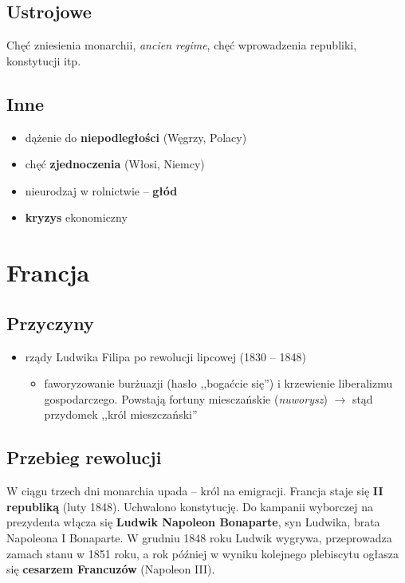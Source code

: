 \documentclass [a4paper, 11pt, oneside]{book}
\begin{document}
        \subsection{Ustrojowe} %
        \label{sub:ustrojowe}
            Chęć zniesienia monarchii, \emph{ancien regime}, chęć wprowadzenia republiki, konstytucji itp.
        \subsection{Inne} %
        \label{sub:inne}
            \begin{itemize}
                \item dążenie do \textbf{niepodległości} (Węgrzy, Polacy)
                \item chęć \textbf{zjednoczenia} (Włosi, Niemcy)
                \item nieurodzaj w rolnictwie -- \textbf{głód}
                \item \textbf{kryzys} ekonomiczny
            \end{itemize}
    \section{Francja} %
    \label{sec:francja}
        \subsection{Przyczyny} %
        \label{sub:przyczyny}
        \begin{itemize}
            \item rządy Ludwika Filipa po rewolucji lipcowej (1830 -- 1848)
            \begin{itemize}
                \item faworyzowanie burżuazji (hasło ,,bogaćcie się'') i krzewienie liberalizmu gospodarczego. Powstają fortuny miesczańskie (\emph{nuworysz}) $\rightarrow$ stąd przydomek ,,król mieszczański''
            \end{itemize}
        \end{itemize}
        \subsection{Przebieg rewolucji} %
        \label{sub:przebieg_rewolucji}
            W ciągu trzech dni monarchia upada -- król na emigracji. Francja staje się \textbf{II republiką} (luty 1848). Uchwalono konstytucję. Do kampanii wyborczej na prezydenta włącza się \textbf{Ludwik Napoleon Bonaparte}, syn Ludwika, brata Napoleona I Bonaparte. W grudniu 1848 roku Ludwik wygrywa, przeprowadza zamach stanu w 1851 roku, a rok później w wyniku kolejnego plebiscytu ogłasza się \textbf{cesarzem Francuzów} (Napoleon III).
\end{document}
